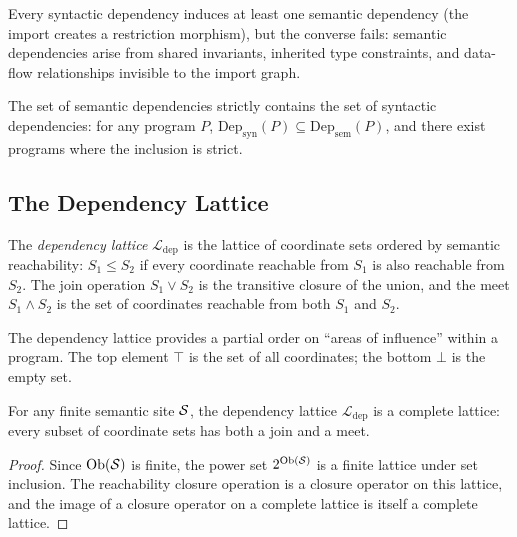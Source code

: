 \documentclass[11pt]{article}
\begin{document}
Every syntactic dependency induces at least one semantic dependency (the
import creates a restriction morphism), but the converse fails: semantic
dependencies arise from shared invariants, inherited type constraints, and
data-flow relationships invisible to the import graph.

\begin{proposition}\label{prop:strict-gen}
The set of semantic dependencies strictly contains the set of syntactic
dependencies: for any program $P$, $\mathrm{Dep}_{\mathrm{syn}}(P) \subseteq
\mathrm{Dep}_{\mathrm{sem}}(P)$, and there exist programs where the
inclusion is strict.
\end{proposition}

\subsection{The Dependency Lattice}\label{sec:dep-lattice}

\begin{definition}\label{def:dep-lattice}
The \emph{dependency lattice} $\mathcal{L}_{\mathrm{dep}}$ is the lattice
of coordinate sets ordered by semantic reachability: $S_1 \leq S_2$ if
every coordinate reachable from $S_1$ is also reachable from $S_2$.
The join operation $S_1 \vee S_2$ is the transitive closure of the union,
and the meet $S_1 \wedge S_2$ is the set of coordinates reachable from
both $S_1$ and $S_2$.
\end{definition}

The dependency lattice provides a partial order on ``areas of influence''
within a program.  The top element $\top$ is the set of all coordinates;
the bottom $\bot$ is the empty set.

\begin{proposition}\label{prop:lattice-complete}
For any finite semantic site $\mathcal{S}$, the dependency lattice
$\mathcal{L}_{\mathrm{dep}}$ is a complete lattice: every subset of
coordinate sets has both a join and a meet.
\end{proposition}

\begin{proof}
Since $\mathrm{Ob}(\mathcal{S})$ is finite, the power set $2^{\mathrm{Ob}(\mathcal{S})}$ is a finite
lattice under set inclusion.  The reachability closure operation is a
closure operator on this lattice, and the image of a closure operator on a
complete lattice is itself a complete lattice.
\end{proof}
\end{document}
